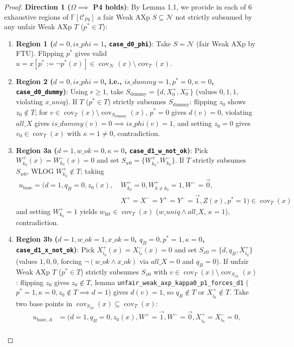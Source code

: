 \documentclass[11pt,a4paper]{article}
\newcommand{\F}{\mathbb{F}}
\newcommand{\C}{\mathcal{C}}
\newcommand{\N}{\mathcal{N}}
\newcommand{\cov}{\operatorname{cov}}
\newcommand{\code}[1]{\texttt{\small #1}}
\begin{document}
\begin{proof}
\textbf{Direction 1 ($\Omega \implies$ P4 holds)}: By Lemma 1.1, we provide in each of 6 exhaustive regions of $\F[\C_{P4}]$ a fair Weak AXp $S \subseteq \N$ not strictly subsumed by any unfair Weak AXp $T$ ($p^* \in T$):
\begin{enumerate}
  \item \textbf{Region 1 ($d=0, is\_phi=1$, \code{case\_d0\_phi})}: Take $S = \N$ (fair Weak AXp by FTU). Flipping $p^*$ gives valid $u = x[p^* := \neg p^*(x)] \in \cov_{\N}(x) \setminus \cov_T(x)$.
  \item \textbf{Region 2 ($d=0, is\_phi=0$, i.e., $is\_dummy=1, p^*=0, \kappa=0$, \code{case\_d0\_dummy})}: Using $r \ge 1$, take $S_{\mathrm{dummy}} = \{d, X_0^+, X_0^-\}$ (values $0,1,1$, violating $x\_uniq$). If $T$ ($p^* \in T$) strictly subsumes $S_{\mathrm{dummy}}$: flipping $z_0$ shows $z_0 \notin T$; for $v \in \cov_T(x) \setminus \cov_{S_{\mathrm{dummy}}}(x)$, $p^*=0$ gives $d(v)=0$, violating $all\_X$ gives $is\_dummy(v)=0 \implies is\_phi(v)=1$, and setting $z_0=0$ gives $v_0 \in \cov_T(x)$ with $\kappa=1 \ne 0$, contradiction.
  \item \textbf{Region 3a ($d=1, w\_ok=0, \kappa=0$, \code{case\_d1\_w\_not\_ok})}: Pick $W_{k_0}^+(x)=W_{k_0}^-(x)=0$ and set $S_{w0}=\{W_{k_0}^+, W_{k_0}^-\}$. If $T$ strictly subsumes $S_{w0}$, WLOG $W_{k_0}^+ \notin T$; taking
  \[
    \begin{aligned}
      u_{\mathrm{base}}=(d=1, q_B=0, z_0(x),\ & W_{k_0}^+=0, W_{k\ne k_0}^+=1, W^-=\vec{0},\\
      & X^+=X^-=Y^+=Y^-=\vec{1}, Z(x), p^*=1) \in \cov_T(x)
    \end{aligned}
  \]
  and setting $W_{k_0}^+=1$ yields $w_{\mathrm{hit}} \in \cov_T(x)$ ($w\_uniq \land all\_X$, $\kappa=1$), contradiction.
  \item \textbf{Region 3b ($d=1, w\_ok=1, x\_ok=0$, $q_B=0, p^*=1, \kappa=0$, \code{case\_d1\_x\_not\_ok})}: Pick $X_{i_0}^+(x)=X_{i_0}^-(x)=0$ and set $S_{x0}=\{d, q_B, X_{i_0}^+\}$ (values $1,0,0$, forcing $\neg(w\_ok \land x\_ok)$ via $all\_X=0$ and $q_B=0$). If unfair Weak AXp $T$ ($p^* \in T$) strictly subsumes $S_{x0}$ with $v \in \cov_T(x) \setminus \cov_{S_{x0}}(x)$: flipping $z_0$ gives $z_0 \notin T$, lemma \code{unfair\_weak\_axp\_kappa0\_p1\_forces\_d1} ($p^*=1, \kappa=0, z_0 \notin T \implies d=1$) gives $d(v)=1$, so $q_B \notin T$ or $X_{i_0}^+ \notin T$. Take two base points in $\cov_{S_{x0}}(x) \subseteq \cov_T(x)$:
  \[
    \begin{aligned}
      u_{\mathrm{base},A} &= (d=1, q_B=0, z_0(x), W^+=\vec{1}, W^-=\vec{0}, X_{i_0}^+=X_{i_0}^-=0,\\

\end{aligned}\]
\end{enumerate}
\end{proof}
\end{document}
